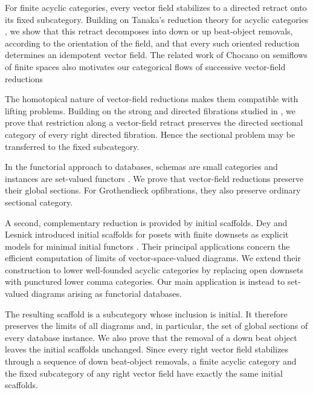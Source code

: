 \documentclass[12pt]{amsart}
\theoremstyle{definition}
\theoremstyle{remark}
\numberwithin{figure}{section}%
\begin{document}
For finite acyclic categories, every vector field stabilizes to a directed retract onto its fixed subcategory. Building on Tanaka's reduction theory for acyclic categories \cite{StrongHomTan,SimpleHom_Tan}, we show that this retract decomposes into down or up beat-object removals, according to the orientation of the field, and that every such oriented reduction determines an idempotent vector field. The related work of Chocano on semiflows of finite spaces \cite{ChocanoFlowsAlexandroff,ChocanoSemiflows} also motivates our categorical flows of successive vector-field
reductions

The homotopical nature of vector-field reductions makes them compatible with lifting problems. Building on the strong and directed fibrations studied in \cite{carcaciacampos2026weakstrongfibrationsfunctors,
DirectedHomotopyDatabases}, we prove that restriction along a vector-field retract preserves the directed sectional category of every right directed fibration. Hence the sectional problem may be transferred to the fixed subcategory.

In the functorial approach to databases, schemas are small categories and instances are set-valued functors \cite{SevenSketches,SpivakDataMigration,SpivakDatabaseQueries}. We prove that vector-field reductions preserve their global sections. For Grothendieck opfibrations, they also preserve ordinary sectional category.

A second, complementary reduction is provided by initial scaffolds. Dey and Lesnick introduced initial scaffolds for posets with finite downsets as explicit models for minimal initial functors \cite{dey2026limitcomputationposetsminimal}. Their principal applications concern the efficient computation of limits of vector-space-valued diagrams. We extend their construction to lower well-founded acyclic categories by replacing open downsets with punctured lower comma categories. Our main application is instead to set-valued diagrams arising as functorial databases.

The resulting scaffold is a subcategory whose inclusion is initial. It therefore preserves the limits of all diagrams and, in particular, the set of global sections of every database instance. We also prove that the removal of a down beat object leaves the initial scaffolds unchanged. Since every right vector field stabilizes through a sequence of down beat-object removals, a finite acyclic category and the fixed subcategory of any right vector field have exactly the same initial scaffolds. 
\end{document}

